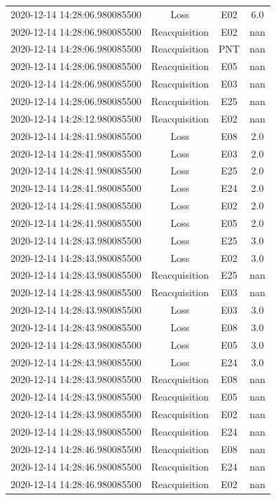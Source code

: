 \begin{enumerate}
\begin{longtabu}{cccc}
2020{-}12{-}14 14:28:06.980085500&Loss&E02&6.0\\%
2020{-}12{-}14 14:28:06.980085500&Reacquisition&E02&nan\\%
2020{-}12{-}14 14:28:06.980085500&Reacquisition&PNT&nan\\%
2020{-}12{-}14 14:28:06.980085500&Reacquisition&E05&nan\\%
2020{-}12{-}14 14:28:06.980085500&Reacquisition&E03&nan\\%
2020{-}12{-}14 14:28:06.980085500&Reacquisition&E25&nan\\%
2020{-}12{-}14 14:28:12.980085500&Reacquisition&E02&nan\\%
2020{-}12{-}14 14:28:41.980085500&Loss&E08&2.0\\%
2020{-}12{-}14 14:28:41.980085500&Loss&E03&2.0\\%
2020{-}12{-}14 14:28:41.980085500&Loss&E25&2.0\\%
2020{-}12{-}14 14:28:41.980085500&Loss&E24&2.0\\%
2020{-}12{-}14 14:28:41.980085500&Loss&E02&2.0\\%
2020{-}12{-}14 14:28:41.980085500&Loss&E05&2.0\\%
2020{-}12{-}14 14:28:43.980085500&Loss&E25&3.0\\%
2020{-}12{-}14 14:28:43.980085500&Loss&E02&3.0\\%
2020{-}12{-}14 14:28:43.980085500&Reacquisition&E25&nan\\%
2020{-}12{-}14 14:28:43.980085500&Reacquisition&E03&nan\\%
2020{-}12{-}14 14:28:43.980085500&Loss&E03&3.0\\%
2020{-}12{-}14 14:28:43.980085500&Loss&E08&3.0\\%
2020{-}12{-}14 14:28:43.980085500&Loss&E05&3.0\\%
2020{-}12{-}14 14:28:43.980085500&Loss&E24&3.0\\%
2020{-}12{-}14 14:28:43.980085500&Reacquisition&E08&nan\\%
2020{-}12{-}14 14:28:43.980085500&Reacquisition&E05&nan\\%
2020{-}12{-}14 14:28:43.980085500&Reacquisition&E02&nan\\%
2020{-}12{-}14 14:28:43.980085500&Reacquisition&E24&nan\\%
2020{-}12{-}14 14:28:46.980085500&Reacquisition&E08&nan\\%
2020{-}12{-}14 14:28:46.980085500&Reacquisition&E24&nan\\%
2020{-}12{-}14 14:28:46.980085500&Reacquisition&E02&nan\\%

\end{longtabu}
\end{enumerate}

